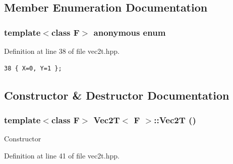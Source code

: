 \subsection{Member Enumeration Documentation}
\subsubsection{\setlength{\rightskip}{0pt plus 5cm}template$<$class F$>$ anonymous enum}\label{classVec2T_dca29a1140aadadfd92b34a02fa516ef_dca29a1140aadadfd92b34a02fa516ef}


\begin{Desc}
\item[Enumerator: ]\par
\begin{description}
\item[{\em 
X\label{classVec2T_dca29a1140aadadfd92b34a02fa516ef_dca29a1140aadadfd92b34a02fa516ef02129bb861061d1a052c592e2dc6b383}
}]\item[{\em 
Y\label{classVec2T_dca29a1140aadadfd92b34a02fa516ef_dca29a1140aadadfd92b34a02fa516ef57cec4137b614c87cb4e24a3d003a3e0}
}]\end{description}
\end{Desc}



Definition at line 38 of file vec2t.hpp.

\footnotesize\begin{verbatim}38 { X=0, Y=1 };
\end{verbatim}\normalsize 




\subsection{Constructor \& Destructor Documentation}
\subsubsection{\setlength{\rightskip}{0pt plus 5cm}template$<$class F$>$ {\bf Vec2T}$<$ F $>$::{\bf Vec2T} ()\hspace{0.3cm}{\tt  [inline]}}\label{classVec2T_9e689e89cdd34bcc8537ba28c91c5934_9e689e89cdd34bcc8537ba28c91c5934}


Constructor 

Definition at line 41 of file vec2t.hpp.

